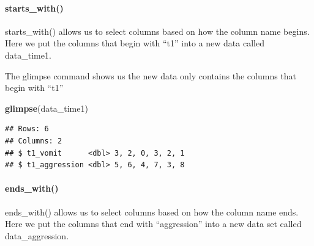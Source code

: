 \documentclass[
]{krantz}
\makeatletter
\newenvironment{Shaded}{\begin{snugshade}}{\end{snugshade}}
\newcommand{\KeywordTok}[1]{\textcolor[rgb]{0.27,0.27,0.27}{\textbf{#1}}}
\newcommand{\NormalTok}[1]{#1}
\newcommand{\OperatorTok}[1]{\textcolor[rgb]{0.43,0.43,0.43}{\textbf{#1}}}
\newcommand{\StringTok}[1]{\textcolor[rgb]{0.5,0.5,0.5}{#1}}
\newenvironment{kframe}{%
\medskip{}
\setlength{\fboxsep}{.8em}
 \def\at@end@of@kframe{}%
 \ifinner\ifhmode%
  \def\at@end@of@kframe{\end{minipage}}%
  \begin{minipage}{\columnwidth}%
 \fi\fi%
 \def\FrameCommand##1{\hskip\@totalleftmargin \hskip-\fboxsep
 \colorbox{shadecolor}{##1}\hskip-\fboxsep
     \hskip-\linewidth \hskip-\@totalleftmargin \hskip\columnwidth}%
 \MakeFramed {\advance\hsize-\width
   \@totalleftmargin\z@ \linewidth\hsize
   \@setminipage}}%
 {\par\unskip\endMakeFramed%
 \at@end@of@kframe}
\renewenvironment{Shaded}{\begin{kframe}}{\end{kframe}}
\makeatother
\begin{document}
\hypertarget{starts_with}{%
\paragraph{starts\_with()}\label{starts_with}}

starts\_with() allows us to select columns based on how the column name begins. Here we put the columns that begin with ``t1'' into a new data called data\_time1.

\begin{Shaded}
\end{Shaded}

The glimpse command shows us the new data only contains the columns that begin with ``t1''

\begin{Shaded}
\begin{Highlighting}[]
\KeywordTok{glimpse}\NormalTok{(data_time1)}
\end{Highlighting}
\end{Shaded}

\begin{verbatim}
## Rows: 6
## Columns: 2
## $ t1_vomit      <dbl> 3, 2, 0, 3, 2, 1
## $ t1_aggression <dbl> 5, 6, 4, 7, 3, 8
\end{verbatim}

\hypertarget{ends_with}{%
\paragraph{ends\_with()}\label{ends_with}}

ends\_with() allows us to select columns based on how the column name ends. Here we put the columns that end with ``aggression'' into a new data set called data\_aggression.

\begin{Shaded}
\end{Shaded}
\end{document}

